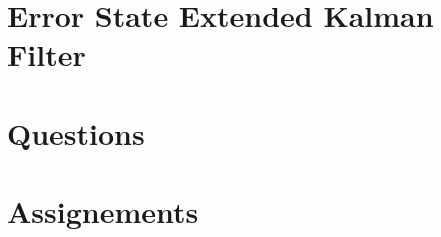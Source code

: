 \section{Error State Extended Kalman Filter}
\label{error_state_extended_kalman_filter}
\section{Questions}
\section{Assignements}

